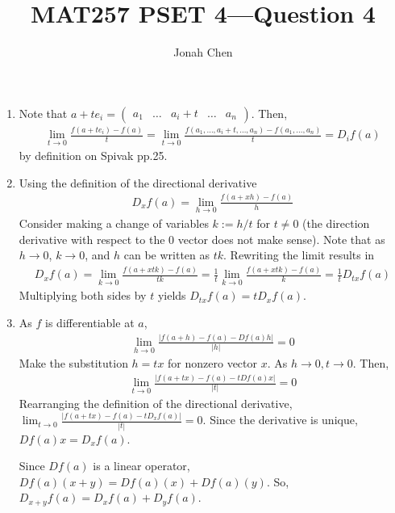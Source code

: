 \documentclass{exam}
\title{MAT257 PSET 4---Question 4}
\author{Jonah Chen}
\numberwithin{equation}{section}
\begin{document}
    \sffamily
    \maketitle
    \begin{enumerate}[label=(\alph*)]
        \item Note that $a+te_i=\begin{pmatrix}
            a_1 & \dots & a_i+t & \dots & a_n
        \end{pmatrix}$. Then, 
        \begin{align*}
            \lim_{t\to0}\frac{f(a+te_i)-f(a)}{t}=\lim_{t\to0}\frac{f(a_1,\dots,a_i+t,\dots,a_n)-f(a_1,\dots,a_n)}{t}=D_if(a)
        \end{align*}
        by definition on Spivak pp.25.
        \item Using the definition of the directional derivative
        \begin{align*}
            D_{x}f(a)=\lim_{h\to0}\frac{f(a+xh)-f(a)}{h}
        \end{align*}
        Consider making a change of variables $k:=h/t$ for $t\neq0$ (the direction derivative with respect to the 0 vector does not make sense). Note that as $h\to 0$, $k\to 0$, and $h$ can be written as $tk$. Rewriting the limit results in 
        \begin{align*}
            D_{x}f(a)=\lim_{k\to0}\frac{f(a+xtk)-f(a)}{tk}=\frac{1}{t}\lim_{k\to0}\frac{f(a+xtk)-f(a)}{k}=\frac{1}{t}D_{tx}f(a)
        \end{align*}
        Multiplying both sides by $t$ yields $D_{tx}f(a)=tD_xf(a)$.
        \item As $f$ is differentiable at $a$, \begin{align*}
            \lim_{h\to0}\frac{|f(a+h)-f(a)-Df(a)h|}{|h|}=0
        \end{align*}
        Make the substitution $h=tx$ for nonzero vector $x$. As $h\to0,t\to0$. Then,
        \begin{align*}
            \lim_{t\to0}\frac{|f(a+tx)-f(a)-tDf(a)x|}{|t|}=0
        \end{align*}
        Rearranging the definition of the directional derivative, $\lim_{t\to0}\frac{|f(a+tx)-f(a)-tD_xf(a)|}{|t|}=0$. Since the derivative is unique, $Df(a)x=D_xf(a)$. 

        Since $Df(a)$ is a linear operator, $Df(a)(x+y)=Df(a)(x)+Df(a)(y)$. So, $D_{x+y}f(a)=D_xf(a)+D_yf(a)$. 
    \end{enumerate}
\end{document}
